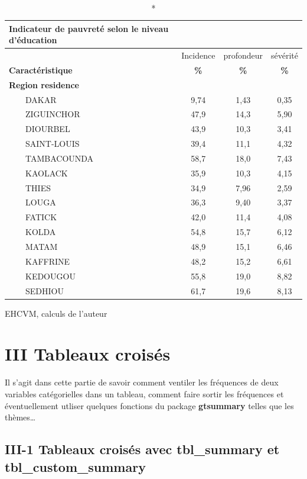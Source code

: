 \documentclass[
]{article}
\begin{document}
\setlength{\LTpost}{0mm}
\begin{longtable}{lccc}
\caption*{
{\large \textbf{Indicateur de pauvreté selon le niveau
d'éducation}}
} \\ 
\toprule
 & Incidence & profondeur & sévérité \\ 
\cmidrule(lr){2-2} \cmidrule(lr){3-3} \cmidrule(lr){4-4}
\textbf{Caractéristique} & \textbf{\%} & \textbf{\%} & \textbf{\%} \\ 
\midrule\addlinespace[2.5pt]
\textbf{Region residence} &  &  &  \\ 
    DAKAR & 9,74 & 1,43 & 0,35 \\ 
    ZIGUINCHOR & 47,9 & 14,3 & 5,90 \\ 
    DIOURBEL & 43,9 & 10,3 & 3,41 \\ 
    SAINT-LOUIS & 39,4 & 11,1 & 4,32 \\ 
    TAMBACOUNDA & 58,7 & 18,0 & 7,43 \\ 
    KAOLACK & 35,9 & 10,3 & 4,15 \\ 
    THIES & 34,9 & 7,96 & 2,59 \\ 
    LOUGA & 36,3 & 9,40 & 3,37 \\ 
    FATICK & 42,0 & 11,4 & 4,08 \\ 
    KOLDA & 54,8 & 15,7 & 6,12 \\ 
    MATAM & 48,9 & 15,1 & 6,46 \\ 
    KAFFRINE & 48,2 & 15,2 & 6,61 \\ 
    KEDOUGOU & 55,8 & 19,0 & 8,82 \\ 
    SEDHIOU & 61,7 & 19,6 & 8,13 \\ 
\bottomrule
\end{longtable}
\begin{minipage}{\linewidth}
EHCVM, calculs de l'auteur\\
\end{minipage}

\hypertarget{iii-tableaux-croisuxe9s}{%
\section{III Tableaux croisés}\label{iii-tableaux-croisuxe9s}}

Il s'agit dans cette partie de savoir comment ventiler les fréquences de
deux variables catégorielles dans un tableau, comment faire sortir les
fréquences et éventuellement utliser quelques fonctions du package
\textbf{gtsummary} telles que les thèmes\ldots{}

\hypertarget{iii-1-tableaux-croisuxe9s-avec-tbl_summary-et-tbl_custom_summary}{%
\subsection{III-1 Tableaux croisés avec tbl\_summary et
tbl\_custom\_summary}\label{iii-1-tableaux-croisuxe9s-avec-tbl_summary-et-tbl_custom_summary}}
\end{document}
